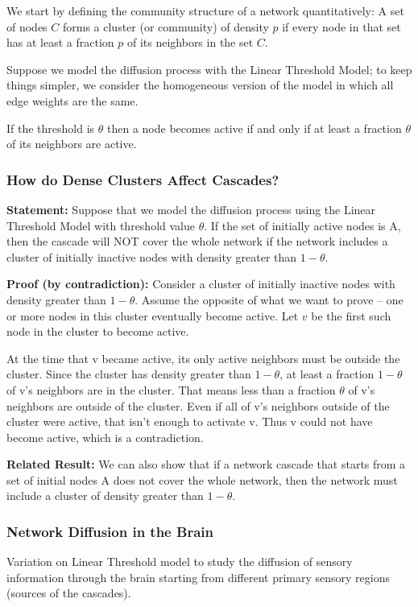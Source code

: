 \documentclass[11pt]{scrartcl} %
\begin{document}
We start by defining the community structure of a network quantitatively: A set of nodes $C$ forms a cluster (or community) of density $p$ if every node in that set has at least a fraction $p$ of its neighbors in the set $C$.

Suppose we model the diffusion process with the Linear Threshold Model; to keep things simpler, we consider the homogeneous version of the model in which all edge weights are the same.

If the threshold is $\theta$ then a node becomes active if and only if at least a fraction $\theta$ of its neighbors are active.

\subsubsection{How do Dense Clusters Affect Cascades?}
\textbf{Statement:} Suppose that we model the diffusion process using the Linear Threshold Model with threshold value $\theta$. If the set of initially active nodes is A, then the cascade will NOT cover the whole network if the network includes a cluster of initially inactive nodes with density greater than $1-\theta$.

\textbf{Proof (by contradiction):} Consider a cluster of initially inactive nodes with density greater than $1-\theta$. Assume the opposite of what we want to prove -- one or more nodes in this cluster eventually become active. Let $v$ be the first such node in the cluster to become active. 

At the time that v became active, its only active neighbors must be outside the cluster. Since the cluster has density greater than $1-\theta$, at least a fraction $1-\theta$ of v's neighbors are in the cluster. That means less than a fraction $\theta$ of v's neighbors are outside of the cluster. Even if all of v's neighbors outside of the cluster were active, that isn't enough to activate v. Thus v could not have become active, which is a contradiction. %

\textbf{Related Result:} We can also show that if a network cascade that starts from a set of initial nodes A does not cover the whole network, then the network must include a cluster of density greater than $1-\theta$.

\subsubsection{Network Diffusion in the Brain}
Variation on Linear Threshold model to study the diffusion of sensory information through the brain starting from different primary sensory regions (sources of the cascades). 
\end{document}
